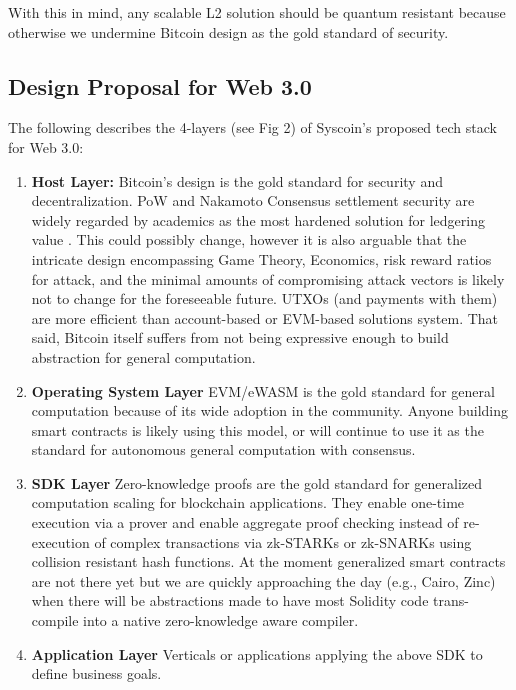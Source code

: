 \documentclass[peerreview]{ieeesyscoin}
\begin{document}
With this in mind, any scalable L2 solution should be quantum resistant because otherwise we undermine Bitcoin design as the gold standard of security.


\subsection{Design Proposal for Web 3.0}

The following describes the 4-layers (see Fig 2) of Syscoin’s proposed tech stack for Web 3.0:

\begin{enumerate}
\item \textbf{Host Layer:} Bitcoin’s design is the gold standard for security and decentralization. PoW and Nakamoto Consensus settlement security are widely regarded by academics as the most hardened solution for ledgering value \cite{Bit15}. This could possibly change, however it is also arguable that the intricate design encompassing Game Theory, Economics, risk reward ratios for attack, and the minimal amounts of compromising attack vectors is likely not to change for the foreseeable future. UTXOs (and payments with them) are more efficient than account-based or EVM-based solutions system. That said, Bitcoin itself suffers from not being expressive enough to build abstraction for general computation. 
\item \textbf{Operating System Layer} EVM/eWASM is the gold standard for general computation because of its wide adoption in the community. Anyone building smart contracts is likely using this model, or will continue to use it as the standard for autonomous general computation with consensus.
\item \textbf{SDK Layer} Zero-knowledge proofs are the gold standard for generalized computation scaling for blockchain applications. They enable one-time execution via a prover and enable aggregate proof checking instead of re-execution of complex transactions via zk-STARKs or zk-SNARKs using collision resistant hash functions. At the moment generalized smart contracts are not there yet but we are quickly approaching the day (e.g., Cairo, Zinc) when there will be abstractions made to have most Solidity code trans-compile into a native zero-knowledge aware compiler.
\item \textbf{Application Layer} Verticals or applications applying the above SDK to define business goals. 
\end{enumerate}
\end{document}
